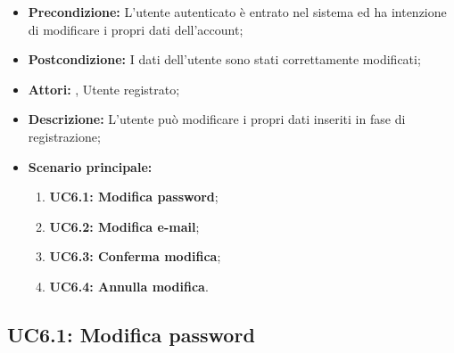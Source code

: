 \begin{itemize}
	\item \textbf{Precondizione:} L’utente autenticato è entrato nel sistema ed ha intenzione di modificare i propri dati dell’account;
	\item \textbf{Postcondizione:} I dati dell’utente sono stati correttamente modificati;
	\item \textbf{Attori:} , Utente registrato;
	\item \textbf{Descrizione:} L’utente può modificare i propri dati inseriti in fase di registrazione;
	\item \textbf{Scenario principale:}
	\begin{enumerate}
		\item \textbf{ UC6.1: Modifica password};
		\item \textbf{ UC6.2: Modifica e-mail};
		\item \textbf{ UC6.3: Conferma modifica};
		\item \textbf{ UC6.4: Annulla modifica}.
	\end{enumerate}
\end{itemize}
\subsection{ UC6.1: Modifica password}

